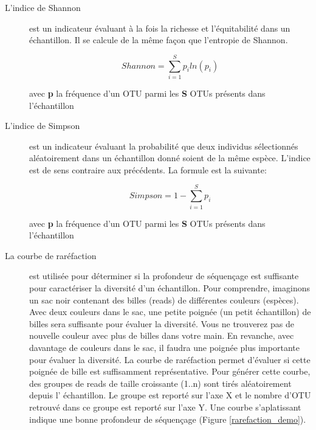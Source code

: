 \documentclass[12pt,a4paper]{article}
\begin{document}
\begin{description}
\item[L'indice de Shannon] est un indicateur évaluant à la fois la richesse et l'équitabilité dans un échantillon. Il se calcule de la même façon que l’entropie de Shannon.

\begin{mycapequ}[!h]
   \begin{equation}
     Shannon = \sum_{i=1}^Sp_{i}ln(p_{i})
   \end{equation}
      \caption{avec \textbf{p} la fréquence d'un OTU parmi les \textbf{S} OTUs présents dans l'échantillon}
\end{mycapequ}

\item[L'indice de Simpson] est un indicateur évaluant la probabilité que deux individus sélectionnés aléatoirement dans un échantillon donné soient de la même espèce. L'indice est de sens contraire aux précédents. La formule est la suivante:

\begin{mycapequ}[!h]
   \begin{equation}
     Simpson = 1 - \sum_{i=1}^Sp_{i}
   \end{equation}
      \caption{avec \textbf{p} la fréquence d'un OTU parmi les \textbf{S} OTUs présents dans l'échantillon}
\end{mycapequ}

\newpage

\item[La courbe de raréfaction] est utilisée pour déterminer si la profondeur de séquençage est suffisante pour caractériser la diversité d’un échantillon. Pour comprendre, imaginons un sac noir contenant des billes (reads) de différentes couleurs (espèces). Avec deux couleurs dans le sac, une petite poignée (un petit échantillon) de billes sera suffisante pour évaluer la diversité. Vous ne trouverez pas de nouvelle couleur avec plus de billes dans votre main. En revanche, avec davantage de couleurs dans le sac, il faudra une poignée plus importante pour évaluer la diversité. La courbe de raréfaction permet d'évaluer si cette poignée de bille est suffisamment représentative.
Pour générer cette courbe, des groupes de reads de taille croissante (1..n) sont tirés aléatoirement depuis l' échantillon. Le groupe est reporté sur l'axe X et le nombre d'OTU retrouvé dans ce groupe est reporté sur l’axe Y.
Une courbe s’aplatissant indique une bonne profondeur de séquençage (Figure \ref{rarefaction_demo}).
\end{description}
\end{document}
